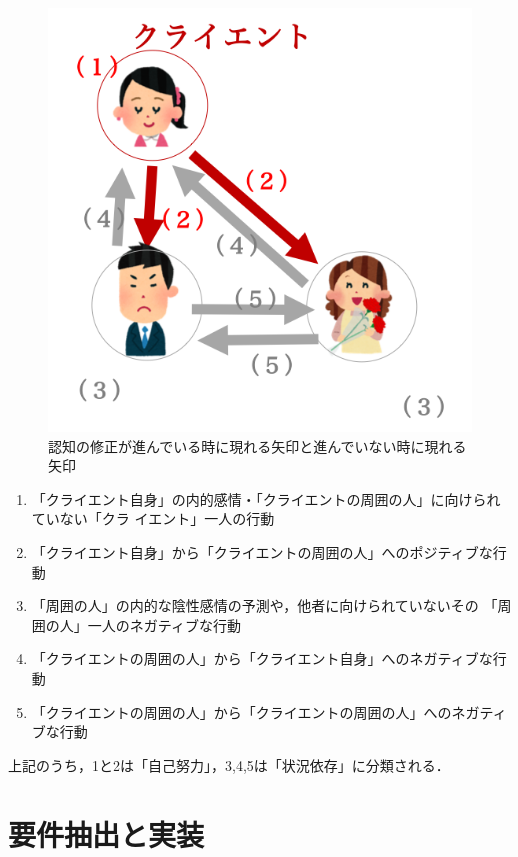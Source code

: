 \documentclass[shuuron]{kuee}
\begin{document}
\begin{figure}
  \begin{center}
    \includegraphics[width=\linewidth]{arrow.png}
  \end{center}
  \caption{認知の修正が進んでいる時に現れる矢印と進んでいない時に現れる矢印}
  \label{fig:arrow}
\end{figure}

\begin{enumerate}
  \item 「クライエント自身」の内的感情・「クライエントの周囲の人」に向けられていない「クラ
  イエント」一人の行動
  \item 「クライエント自身」から「クライエントの周囲の人」へのポジティブな行動


  \item 「周囲の人」の内的な陰性感情の予測や，他者に向けられていないその
  「周囲の人」一人のネガティブな行動
  \item 「クライエントの周囲の人」から「クライエント自身」へのネガティブな行動
  \item 「クライエントの周囲の人」から「クライエントの周囲の人」へのネガティブな行動

\end{enumerate}
上記のうち，1と2は「自己努力」，3,4,5は「状況依存」に分類される．

\section{要件抽出と実装}
\end{document}
